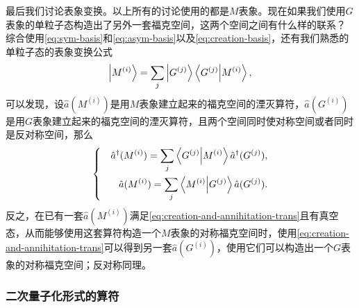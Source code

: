 \documentclass[UTF8, a4paper]{ctexart}
\newenvironment{bigcase}{\left\{\quad\begin{aligned}}{\end{aligned}\right.}
\begin{document}
最后我们讨论表象变换。以上所有的讨论使用的都是$M$表象。现在如果我们使用$G$表象的单粒子态构造出了另外一套福克空间，这两个空间之间有什么样的联系？
综合使用\eqref{eq:sym-basis}和\eqref{eq:asym-basis}以及\eqref{eq:creation-basis}，还有我们熟悉的单粒子态的表象变换公式
\[
    \ket{M^{(i)}} = \sum_j \ket{G^{(j)}} \braket{G^{(j)}}{M^{(i)}},
\]
可以发现，设$\hat{a}(M^{(i)})$是用$M$表象建立起来的福克空间的湮灭算符，$\hat{a}(G^{(i)})$是用$G$表象建立起来的福克空间的湮灭算符，且两个空间同时使对称空间或者同时是反对称空间，那么
\begin{equation}
    \begin{bigcase}
        \hat{a}^\dagger (M^{(i)}) = \sum_j \braket{G^{(j)}}{M^{(i)}} \hat{a}^\dagger (G^{(j)}), \\
        \hat{a} (M^{(i)}) = \sum_j \braket{M^{(i)}}{G^{(j)}} \hat{a} (G^{(j)}).
    \end{bigcase}
    \label{eq:creation-and-annihitation-trans}
\end{equation}
反之，在已有一套$\hat{a}(M^{(i)})$满足\eqref{eq:creation-and-annihitation-trans}且有真空态，从而能够使用这套算符构造一个$M$表象的对称福克空间时，使用\eqref{eq:creation-and-annihitation-trans}可以得到另一套$\hat{a}(G^{(i)})$，使用它们可以构造出一个$G$表象的对称福克空间；反对称同理。

\subsubsection{二次量子化形式的算符}
\end{document}
